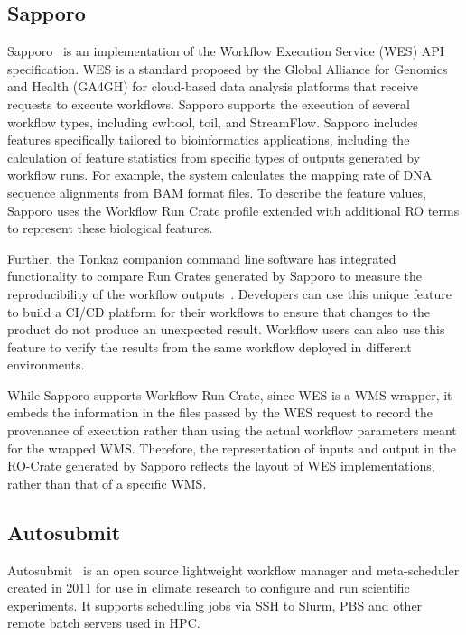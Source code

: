 \documentclass[10pt,letterpaper]{article}
\begin{document}
\subsection{Sapporo}\label{sapporo}

Sapporo~\cite{Suetake 2022a} is an implementation of the Workflow Execution Service (WES) API specification.
WES is a standard proposed by the Global Alliance for Genomics and Health (GA4GH) for cloud-based data analysis platforms that receive requests to execute workflows.
Sapporo supports the execution of several workflow types, including cwltool, toil, and StreamFlow.
Sapporo includes features specifically tailored to bioinformatics applications, including the calculation of feature statistics from specific types of outputs generated by workflow runs.
For example, the system calculates the mapping rate of DNA sequence alignments from BAM format files.
To describe the feature values, Sapporo uses the Workflow Run Crate profile extended with additional RO terms to represent these biological features.

Further, the Tonkaz companion command line software has integrated functionality to compare Run Crates generated by Sapporo to measure the reproducibility of the workflow outputs~\cite{Suetake 2022b}.
Developers can use this unique feature to build a CI/CD platform for their workflows to ensure that changes to the product do not produce an unexpected result.
Workflow users can also use this feature to verify the results from the same workflow deployed in different environments.

While Sapporo supports Workflow Run Crate, since WES is a WMS wrapper, it embeds the information in the files passed by the WES request to record the provenance of execution rather than using the actual workflow parameters meant for the wrapped WMS.
Therefore, the representation of inputs and output in the RO-Crate generated by Sapporo reflects the layout of WES implementations, rather than that of a specific WMS.

\subsection{Autosubmit}\label{autosubmit}

Autosubmit~\cite{Manubens-Gil 2016} is an open source lightweight workflow manager and meta-scheduler created in 2011 for use in climate research to configure and run scientific experiments.
It supports scheduling jobs via SSH to Slurm, PBS and other remote batch servers used in HPC.
\end{document}
